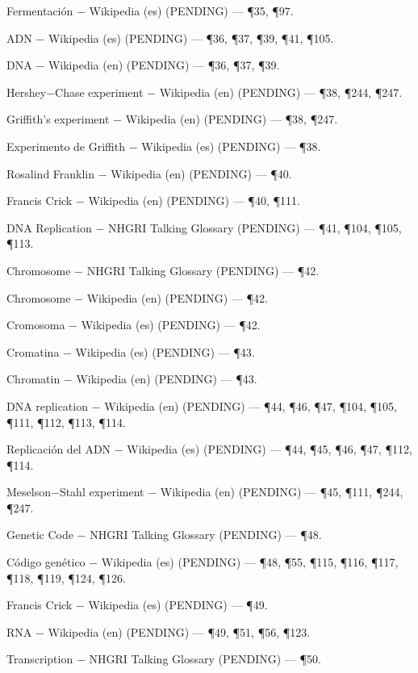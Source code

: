 \documentclass{book}
\begin{document}
\noindent Fermentación \(-\) Wikipedia (es) (PENDING) --- \P35, \P97.

\noindent ADN \(-\) Wikipedia (es) (PENDING) --- \P36, \P37, \P39, \P41, \P105.

\noindent DNA \(-\) Wikipedia (en) (PENDING) --- \P36, \P37, \P39.

\noindent Hershey\(-\)Chase experiment \(-\) Wikipedia (en) (PENDING) --- \P38, \P244, \P247.

\noindent Griffith's experiment \(-\) Wikipedia (en) (PENDING) --- \P38, \P247.

\noindent Experimento de Griffith \(-\) Wikipedia (es) (PENDING) --- \P38.

\noindent Rosalind Franklin \(-\) Wikipedia (en) (PENDING) --- \P40.

\noindent Francis Crick \(-\) Wikipedia (en) (PENDING) --- \P40, \P111.

\noindent DNA Replication \(-\) NHGRI Talking Glossary (PENDING) --- \P41, \P104, \P105, \P113.

\noindent Chromosome \(-\) NHGRI Talking Glossary (PENDING) --- \P42.

\noindent Chromosome \(-\) Wikipedia (en) (PENDING) --- \P42.

\noindent Cromosoma \(-\) Wikipedia (es) (PENDING) --- \P42.

\noindent Cromatina \(-\) Wikipedia (es) (PENDING) --- \P43.

\noindent Chromatin \(-\) Wikipedia (en) (PENDING) --- \P43.

\noindent DNA replication \(-\) Wikipedia (en) (PENDING) --- \P44, \P46, \P47, \P104, \P105, \P111, \P112, \P113, \P114.

\noindent Replicación del ADN \(-\) Wikipedia (es) (PENDING) --- \P44, \P45, \P46, \P47, \P112, \P114.

\noindent Meselson\(-\)Stahl experiment \(-\) Wikipedia (en) (PENDING) --- \P45, \P111, \P244, \P247.

\noindent Genetic Code \(-\) NHGRI Talking Glossary (PENDING) --- \P48.

\noindent Código genético \(-\) Wikipedia (es) (PENDING) --- \P48, \P55, \P115, \P116, \P117, \P118, \P119, \P124, \P126.

\noindent Francis Crick \(-\) Wikipedia (es) (PENDING) --- \P49.

\noindent RNA \(-\) Wikipedia (en) (PENDING) --- \P49, \P51, \P56, \P123.

\noindent Transcription \(-\) NHGRI Talking Glossary (PENDING) --- \P50.
\end{document}
